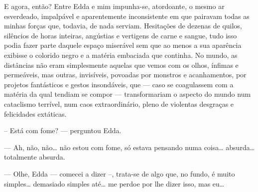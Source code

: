 E agora, então? Entre Edda e mim impunha-se, atordoante, o mesmo ar
esverdeado, impalpável e aparentemente inconsistente em que pairavam todas as
minhas forças que, todavia, de nada serviam. Hesitações de dezenas de quilos,
silêncios de horas inteiras, angústias e vertigens de carne e sangue, tudo
isso podia fazer parte daquele espaço miserável sem que ao menos a sua
aparência exibisse o colorido negro e a matéria embaciada que continha. No
mundo, as distâncias não eram simplesmente aquelas que vemos com os olhos,
ínfimas e permeáveis, mas outras, invisíveis, povoadas por monstros e
acanhamentos, por projetos fantásticos e gestos insondáveis, que --- caso se
coagulassem com a matéria da qual tendiam se compor --- transformariam o
aspecto do mundo num cataclismo terrível, num caos extraordinário, pleno de
violentas desgraças e felicidades extáticas.



-- Está com fome? --- perguntou Edda.

--- Ah, não, não\ldots{} não estou com fome, só estava pensando numa
    coisa\ldots{} absurda\ldots{} totalmente absurda.


--- Olhe, Edda --- comecei a dizer --, trata-se de algo que, no fundo, é muito
    simples\ldots{} demasiado simples até\ldots{} me perdoe por lhe dizer
    isso, mas eu\ldots{}

